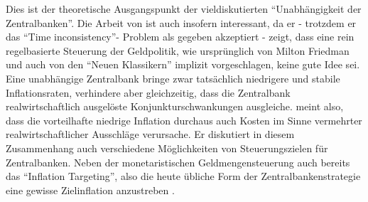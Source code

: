 Dies ist der theoretische Ausgangspunkt der vieldiskutierten "`Unabhängigkeit der Zentralbanken"'. Die Arbeit von \textcite{Rogoff1985} ist auch insofern interessant, da er - trotzdem er das "`Time inconsistency"'- Problem als gegeben akzeptiert - zeigt, dass eine rein regelbasierte Steuerung der Geldpolitik, wie ursprünglich von Milton Friedman und auch von den "`Neuen Klassikern"' implizit vorgeschlagen, keine gute Idee sei. Eine unabhängige Zentralbank bringe zwar tatsächlich niedrigere und stabile Inflationsraten, verhindere aber gleichzeitig, dass die Zentralbank realwirtschaftlich ausgelöste Konjunkturschwankungen ausgleiche. \textcite{Rogoff1985} meint also, dass die vorteilhafte niedrige Inflation durchaus auch Kosten im Sinne vermehrter realwirtschaftlicher Ausschläge verursache. Er diskutiert in diesem Zusammenhang auch verschiedene Möglichkeiten von Steuerungszielen für Zentralbanken. Neben der monetaristischen Geldmengensteuerung auch bereits das "`Inflation Targeting"', also die heute übliche Form der Zentralbankenstrategie eine gewisse Zielinflation anzustreben \parencite[S. 1181]{Rogoff1985}.

